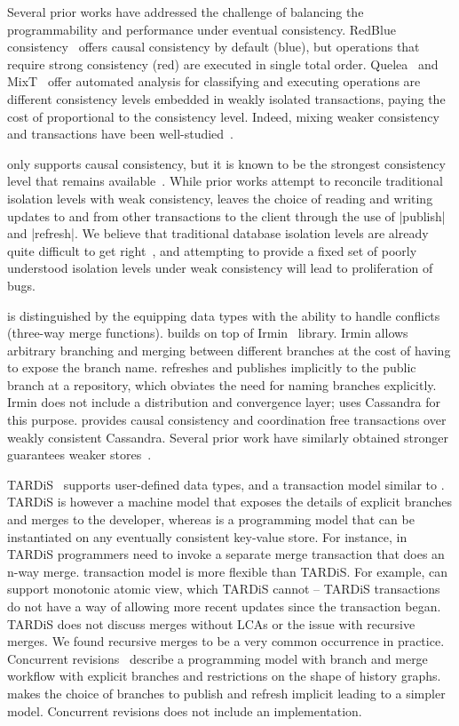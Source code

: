Several prior works have addressed the challenge of balancing the
programmability and performance under eventual consistency. RedBlue
consistency~\cite{Li12} offers causal consistency by default (blue), but
operations that require strong consistency (red) are executed in single total
order. Quelea~\cite{Sivaramakrishnan15} and MixT~\cite{Milano18} offer
automated analysis for classifying and executing operations are different
consistency levels embedded in weakly isolated transactions, paying the cost of
proportional to the consistency level. Indeed, mixing weaker consistency and
transactions have been well-studied~\cite{Brutschy17,Kraska13,CosmosDB}.

\name only supports causal consistency, but it is known to be the strongest
consistency level that remains available~\cite{Llyod11}. While prior works
attempt to reconcile traditional isolation levels with weak consistency, \name
leaves the choice of reading and writing updates to and from other transactions
to the client through the use of |publish| and |refresh|. We believe that
traditional database isolation levels are already quite difficult to get
right~\cite{Kaki17}, and attempting to provide a fixed set of poorly understood
isolation levels under weak consistency will lead to proliferation of bugs.

\name is distinguished by the equipping data types with the ability to handle
conflicts (three-way merge functions). \name builds on top of
Irmin~\cite{Irmin} library. Irmin allows arbitrary branching and merging
between different branches at the cost of having to expose the branch name.
\name refreshes and publishes implicitly to the public branch at a repository,
which obviates the need for naming branches explicitly. Irmin does not include
a distribution and convergence layer; \name uses Cassandra for this purpose.
\name provides causal consistency and coordination free transactions over
weakly consistent Cassandra. Several prior work have similarly obtained
stronger guarantees weaker stores~\cite{Sivaramakrishnan15,Bailis13b}.

TARDiS~\cite{Crooks16} supports user-defined data types, and a transaction
model similar to \name. TARDiS is however a machine model that exposes the
details of explicit branches and merges to the developer, whereas \name is a
programming model that can be instantiated on any eventually consistent
key-value store. For instance, in TARDiS programmers need to invoke a separate
merge transaction that does an n-way merge. \name transaction model is more
flexible than TARDiS. For example, \name can support monotonic atomic view,
which TARDiS cannot -- TARDiS transactions do not have a way of allowing more
recent updates since the transaction began. TARDiS does not discuss merges
without LCAs or the issue with recursive merges. We found recursive merges to
be a very common occurrence in practice. Concurrent
revisions~\cite{Burckhardt12} describe a programming model with branch and
merge workflow with explicit branches and restrictions on the shape of history
graphs. \name makes the choice of branches to publish and refresh implicit
leading to a simpler model. Concurrent revisions does not include an
implementation.
